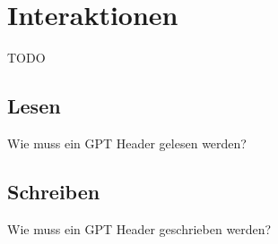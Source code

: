 \section{Interaktionen}
TODO

\subsection{Lesen}
Wie muss ein GPT Header gelesen werden?

\subsection{Schreiben}
Wie muss ein GPT Header geschrieben werden?
